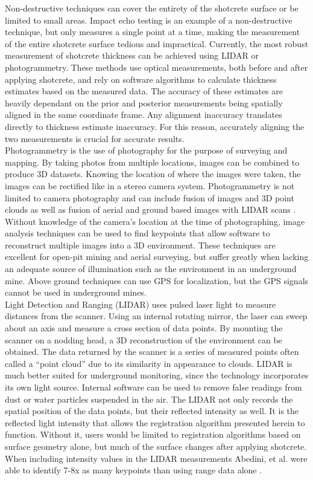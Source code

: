 Non-destructive techniques can cover the entirety of the shotcrete surface or be limited to small areas. Impact echo testing is an example of a non-destructive technique\cite{impact}, but only measures a single point at a time, making the measurement of the entire shotcrete surface tedious and impractical. Currently, the most robust measurement of shotcrete thickness can be achieved using LIDAR or photogrammetry. These methods use optical measurements, both before and after applying shotcrete, and rely on software algorithms to calculate thickness estimates based on the measured data. The accuracy of these estimates are heavily dependant on the prior and posterior measurements being spatially aligned in the same coordinate frame. Any alignment inaccuracy translates directly to thickness estimate inaccuracy. For this reason, accurately aligning the two measurements is crucial for accurate results.\\

Photogrammetry is the use of photography for the purpose of surveying and mapping. By taking photos from multiple locations, images can be combined to produce 3D datasets. Knowing the location of where the images were taken, the images can be rectified like in a stereo camera system. Photogrammetry is not limited to camera photography and can include fusion of images and 3D point clouds \cite{photo1} as well as fusion of aerial and ground based images with LIDAR scans \cite{photo2}. Without knowledge of the camera's location at the time of photographing, image analysis techniques can be used to find keypoints that allow software to reconstruct multiple images into a 3D environment. These techniques are excellent for open-pit mining and aerial surveying, but suffer greatly when lacking an adequate source of illumination such as the environment in an underground mine. Above ground techniques can use GPS for localization, but the GPS signals cannot be used in underground mines.\\

Light Detection and Ranging (LIDAR) uses pulsed laser light to measure distances from the scanner. Using an internal rotating mirror, the laser can sweep about an axis and measure a cross section of data points. By mounting the scanner on a nodding head, a 3D reconstruction of the environment can be obtained. The data returned by the scanner is a series of measured points often called a ``point cloud'' due to its similarity in appearance to clouds. LIDAR is much better suited for underground monitoring, since the technology incorporates its own light source. Internal software can be used to remove false readings from dust or water particles suspended in the air. The LIDAR not only records the spatial position of the data points, but their reflected intensity as well. It is the reflected light intensity that allows the registration algorithm presented herein to function. Without it, users would be limited to registration algorithms based on surface geometry alone, but much of the surface changes after applying shotcrete. When including intensity values in the LIDAR measurements Abedini, et al. were able to identify 7-8x as many keypoints than using range data alone \cite{reg1}.\\

